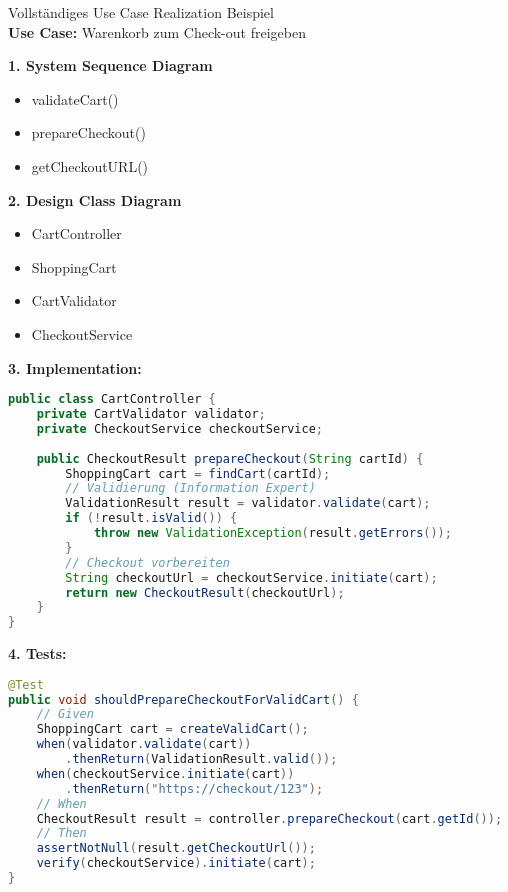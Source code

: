 \begin{example2}{Vollständiges Use Case Realization Beispiel}\\
\textbf{Use Case:} Warenkorb zum Check-out freigeben

\textbf{1. System Sequence Diagram}
\begin{itemize}
    \item validateCart()
    \item prepareCheckout()
    \item getCheckoutURL()
\end{itemize}

\textbf{2. Design Class Diagram}
\begin{itemize}
    \item CartController
    \item ShoppingCart
    \item CartValidator
    \item CheckoutService
\end{itemize}

\textbf{3. Implementation:}
\begin{lstlisting}[language=Java, style=basesmol]
public class CartController {
    private CartValidator validator;
    private CheckoutService checkoutService;
    
    public CheckoutResult prepareCheckout(String cartId) {
        ShoppingCart cart = findCart(cartId);
        // Validierung (Information Expert)
        ValidationResult result = validator.validate(cart);
        if (!result.isValid()) {
            throw new ValidationException(result.getErrors());
        }
        // Checkout vorbereiten
        String checkoutUrl = checkoutService.initiate(cart);
        return new CheckoutResult(checkoutUrl);
    }
}
\end{lstlisting}

\textbf{4. Tests:}
\begin{lstlisting}[language=Java, style=basesmol]
@Test
public void shouldPrepareCheckoutForValidCart() {
    // Given
    ShoppingCart cart = createValidCart();
    when(validator.validate(cart))
        .thenReturn(ValidationResult.valid());
    when(checkoutService.initiate(cart))
        .thenReturn("https://checkout/123");
    // When
    CheckoutResult result = controller.prepareCheckout(cart.getId());
    // Then
    assertNotNull(result.getCheckoutUrl());
    verify(checkoutService).initiate(cart);
}
\end{lstlisting}
\end{example2}


















